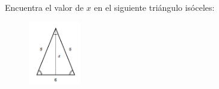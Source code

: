 \question[15] Encuentra el valor de $x$ en el siguiente triángulo isóceles:
\begin{figure}[H]
    \begin{center}
        \includegraphics[width=0.2\textwidth]{../images/pitagoras0.png}
    \end{center}
    \caption{}
    \label{fig:pitagoras0}
\end{figure}